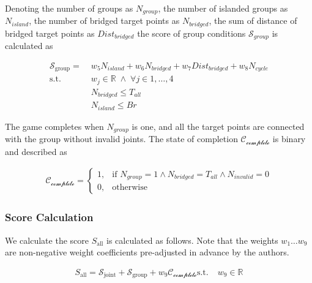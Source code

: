 Denoting the number of groups as $N_{group}$, the number of islanded groups as $N_{island}$, the number of bridged target points as $N_{bridged}$, the sum of distance of bridged target points as $Dist_{bridged}$ the score of group conditions $\mathcal{S}_{group}$ is calculated as

\begin{equation}
 \begin{aligned}
 \mathcal{S}_{\text{group}} =  &\; w_5 N_{island} + w_6 N_{bridged} + w_7 Dist_{bridged} + w_8 N_{cycle}\\
   \textrm{s.t.} & \; w_j  \in \mathbb{R} \; \wedge \;   \forall j \in 1, \dotsc , 4 \\
   & \; N_{bridged} \leq T_{all} \\
   & \; N_{island} \leq Br
 \end{aligned}
 \label{eq:score}
\end{equation}

The game completes when $N_{group}$ is one, and all the target points are connected with the group without invalid joints.
The state of completion $\mathcal{C_\text{complete}}$ is binary and described as

\begin{equation}
 \begin{aligned}
 \mathcal{C_\text{complete}} =
 \begin{cases}
    1,  & \text{if }   N_{group} = 1 \wedge N_{bridged} = T_{all}
    \wedge  N_{invalid} = 0 \\
    0,  & \text{otherwise}
\end{cases}
 \end{aligned}
 \label{eq:complete}
\end{equation}

\subsubsection{Score Calculation}
We calculate the score $S_\text{all}$ is calculated as follows.
Note that the weights $w_1 \dotso  w_9$ are non-negative weight coefficients pre-adjusted in advance by the authors.

\begin{equation}
 \begin{aligned}
 S_\text{all} = \mathcal{S}_{\text{joint}} + \mathcal{S}_{\text{group}} + w_9 \mathcal{C_\text{complete}}
   \textrm{s.t.} & \; w_9  \in \mathbb{R}
 \end{aligned}
 \label{eq:score}
\end{equation}
